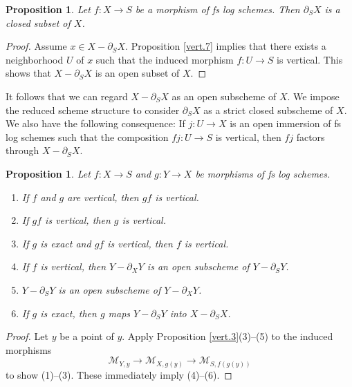\documentclass[10pt]{amsart}
\newtheorem{prop}[thm]{Proposition}
\theoremstyle{definition}
\theoremstyle{remark}
\numberwithin{equation}{subsection}
\newcommand{\cM}{\mathcal{M}}
\begin{document}
\begin{prop}
\label{vert.2}
Let $f\colon X\to S$ be a morphism of fs log schemes.
Then $\partial_S X$ is a closed subset of $X$.
\end{prop}
\begin{proof}
Assume $x\in X-\partial_S X$.
Proposition \ref{vert.7} implies that there exists a neighborhood $U$ of $x$ such that the induced morphism $f\colon U\to S$ is vertical.
This shows that $X-\partial_S X$ is an open subset of $X$.
\end{proof}

It follows that we can regard $X-\partial_S X$ as an open subscheme of $X$.
We impose the reduced scheme structure to consider $\partial_S X$ as a strict closed subscheme of $X$.
We also have the following consequence:
If $j\colon U\to X$ is an open immersion of fs log schemes such that the composition $fj\colon U\to S$ is vertical,
then $fj$ factors through $X-\partial_S X$.


\begin{prop}
\label{vert.9}
Let $f\colon X\to S$ and $g\colon Y\to X$ be morphisms of fs log schemes.
\begin{enumerate}
\item[{\rm (1)}]
If $f$ and $g$ are vertical, then $gf$ is vertical.
\item[{\rm (2)}]
If $gf$ is vertical, then $g$ is vertical.
\item[{\rm (3)}]
If $g$ is exact and $gf$ is vertical, then $f$ is vertical.
\item[{\rm (4)}]
If $f$ is vertical, then $Y-\partial_X Y$ is an open subscheme of $Y-\partial_S Y$.
\item[{\rm (5)}]
$Y-\partial_S Y$ is an open subscheme of $Y-\partial_X Y$.
\item[{\rm (6)}] If $g$ is exact, then $g$ maps $Y-\partial_S Y$ into $X-\partial_S X$.
\end{enumerate}
\end{prop}
\begin{proof}
Let $y$ be a point of $y$.
Apply Proposition \ref{vert.3}(3)--(5) to the induced morphisms
\[
\cM_{Y,y}
\to
\cM_{X,g(y)}
\to
\cM_{S,f(g(y))}
\]
to show (1)--(3).
These immediately imply (4)--(6).
\end{proof}
\end{document}
